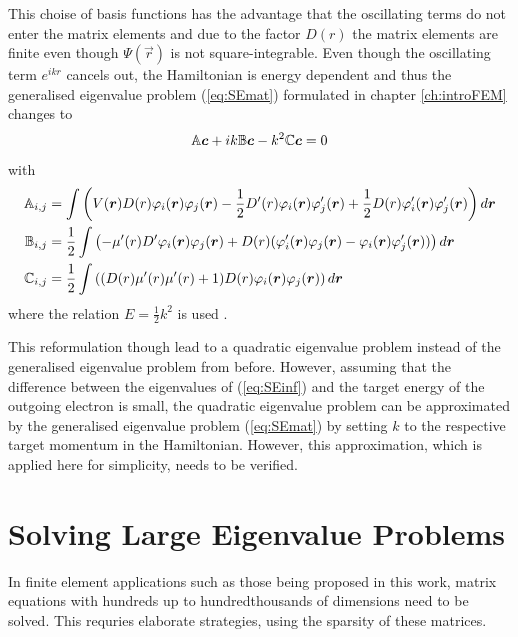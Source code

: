 This choise of basis functions has the advantage that the oscillating terms do not enter the matrix elements and due to the factor $D(r)$ the matrix elements are finite even though $\Psi(\vec{r})$ is not square-integrable.
Even though the oscillating term $e^{ikr}$ cancels out, the Hamiltonian is energy dependent and thus the generalised eigenvalue problem (\ref{eq:SEmat}) formulated in chapter \ref{ch:introFEM} changes to
\begin{equation} \label{eq:SEinf}
\mathbb{A}\bm{c} +ik \mathbb{B}\bm{c}- k^2 \mathbb{C}\bm{c} =0 
\end{equation}
with
\begin{align} \label{eq:InFEMmatrix}
\mathbb{A}_{i,j}& =\int \left(V(\bm{r}) D(r) \varphi_i(\bm{r}) \varphi_j(\bm{r}) 
                 -\frac 12 D'(r) \varphi_i(\bm{r})\varphi'_j(\bm{r})
                 +\frac 12 D(r) \varphi'_i(\bm{r})\varphi'_j(\bm{r}) \right) d\bm{r}\\
\mathbb{B}_{i,j}&=\frac 12 \int\left( -\mu'(r)D' \varphi_i(\bm{r})\varphi_j(\bm{r})
                + D(r) (\varphi'_i(\bm{r})\varphi_j(\bm{r}) -\varphi_i(\bm{r})\varphi'_j(\bm{r})) \right) d\bm{r} \\
\mathbb{C}_{i,j}&= \frac 12 \int\left( (D(r) \mu'(r) \mu'(r) + 1) D(r) \varphi_i(\bm{r}) \varphi_j(\bm{r})\right) d\bm{r}
\end{align}
where the relation $E=\frac 12 k^2$ is used \cite{dreyer}.

This reformulation though lead to a quadratic eigenvalue problem instead of the generalised eigenvalue problem from before.
However, assuming that the difference between the eigenvalues of (\ref{eq:SEinf}) and the target energy of the outgoing electron is small, the quadratic eigenvalue problem can be approximated by the generalised eigenvalue problem (\ref{eq:SEmat}) by setting $k$ to the respective target momentum in the Hamiltonian.
However, this approximation, which is applied here for simplicity, needs to be verified.

\section{Solving Large Eigenvalue Problems}
In finite element applications such as those being proposed in this work, matrix equations with hundreds up to hundredthousands of dimensions need to be solved.
This requries elaborate strategies, using the sparsity of these matrices.

